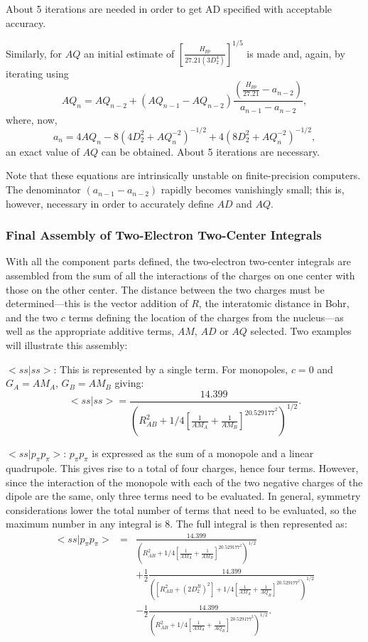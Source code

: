 \documentclass[a4paper]{book}
\begin{document}
About 5 iterations are needed in order to get AD specified
with acceptable accuracy.

 Similarly, for $AQ$ an initial estimate of
$[\frac{H_{pp}}{27.21(3D^4_2)}]^{1/5}$
is made and, again, by iterating using
$$
AQ_n = AQ_{n-2}+(AQ_{n-1}-AQ_{n-2})\frac{(\frac{H_{pp}}{27.21}-a_{n-2})}{a_{n-1}-a_{n-2}},
$$
where, now,
$$
a_n=4AQ_n-8(4D^2_2+AQ^{-2}_n)^{-1/2}+4(8D^2_2+AQ_n^{-2})^{-1/2},
$$
 an exact value of $AQ$ can be obtained. About 5 iterations
are necessary.

Note that these equations are intrinsically unstable on
finite-precision computers. The denominator $(a_{n-1} -a_{n-2} )$
rapidly becomes vanishingly small; this is, however, necessary in
order to accurately define $AD$ and $AQ$.

\subsubsection{Final Assembly of Two-Electron Two-Center Integrals}
 With all the component parts defined, the two-electron
two-center integrals are assembled from the sum of all the
interactions of the charges on one center with those on the
other center. The distance between the two charges must be
determined---this is the vector addition of $R$, the
interatomic distance in Bohr, and the two $c$ terms defining
the location of the charges from the nucleus---as well as
the appropriate additive terms, $AM$, $AD$ or $AQ$ selected. Two
examples will illustrate this assembly:

$ <ss|ss>$: This is represented by a single term. For
monopoles, $c=0$ and $G_A=AM_A$, $G_B=AM_B$ giving:
$$
<ss|ss> = \frac{14.399}
{(R^2_{AB}+1/4[\frac{1}{AM_A} + \frac{1}{AM_B}]^20.529177^2)^{1/2}}.
$$

$<ss|p_{\pi}p_{\pi}>$: $p_{\pi}p_{\pi}$ is expressed as the sum of a monopole
and a linear quadrupole. This gives rise to a total of four
charges, hence four terms. However, since the interaction
of the monopole with each of the two negative charges of the
dipole are the same, only three terms need to be evaluated.
In  general, symmetry considerations lower the total number of
terms that need to be evaluated, so the maximum number in
any integral is 8. The full integral is then represented as:
\begin{eqnarray}
<ss|p_{\pi}p_{\pi}>& =&
\frac{14.399}
{(R^2_{AB}+1/4[\frac{1}{AM_A} + \frac{1}{AM_B}]^20.529177^2)^{1/2}} \nonumber \\
&&+\frac{1}{2}\frac{14.399}
{([R^2_{AB}+(2D_2^B)^2]+1/4[\frac{1}{AM_A} + \frac{1}{AQ_B}]^20.529177^2)^{1/2}} \nonumber \\
&&-\frac{1}{2}\frac{14.399}
{(R^2_{AB}+1/4[\frac{1}{AM_A} + \frac{1}{AQ_B}]^20.529177^2)^{1/2}}.  \nonumber
\end{eqnarray}
\end{document}
